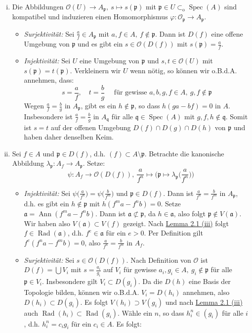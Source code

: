 \documentclass[11pt,b5paper,openany]{memoir}
\begin{document}
\begin{enumerate}[(i)]
\item Die Abbildungen $\mathcal{O}(U)\to A_\mathfrak{p},\ s\mapsto s(\mathfrak{p})$ mit $\mathfrak{p}\in U\subset_\text{o}\operatorname{Spec}(A)$ sind kompatibel und induzieren einen Homomorphismus $\varphi:\mathcal{O}_\mathfrak{p}\to A_\mathfrak{p}$.
\begin{itemize}
\item \textit{Surjektivität:} Sei $\frac{a}{f}\in A_\mathfrak{p}$ mit $a,f\in A,\ f\not\in\mathfrak{p}$. Dann ist $D(f)$ eine offene Umgebung von $\mathfrak{p}$ und es gibt ein $s\in\mathcal{O}(D(f))$ mit $s(\mathfrak{p})=\frac{a}{f}$.
\item \textit{Injektivität:} Sei $U$ eine Umgebung von $\mathfrak{p}$ und $s,t\in\mathcal{O}(U)$ mit $s(\mathfrak{p})=t(\mathfrak{p})$. Verkleinern wir $U$ wenn nötig, so können wir o.B.d.A. annehmen, dass:
\[s=\frac{a}{f},\quad t=\frac{b}{g}\quad \text{ für gewisse } a,b,g,f\in A,\ g,f\not\in\mathfrak{p} \]
Wegen $\frac{a}{f}=\frac{b}{g}$ in $A_\mathfrak{p}$, gibt es ein $h\not\in\mathfrak{p}$, so dass $h(ga-bf)=0$ in $A$. Insbesondere ist $\frac{a}{f}=\frac{b}{g}$ in $A_\mathfrak{q}$ für alle $\mathfrak{q}\in\operatorname{Spec}(A)$ mit $g,f,h\not\in\mathfrak{q}$. Somit ist $s=t$ auf der offenen Umgebung $D(f)\cap D(g)\cap D(h)$ von $\mathfrak{p}$ und haben daher denselben Keim.
\end{itemize}
\item Sei $f\in A$ und $\mathfrak{p}\in D(f)$, d.h. $(f)\subset A\setminus\mathfrak{p}$. Betrachte die kanonische Abbildung $\lambda_\mathfrak{p}:A_f\to A_\mathfrak{p}$. Setze:
\[\psi: A_f \to\mathcal{O}(D(f)),\ \frac{a}{f^n}\mapsto \Big(\mathfrak{p}\mapsto \lambda_\mathfrak{p}\Big(\frac{a}{f^n}\Big)\Big) \]
\begin{itemize}
\item \textit{Injektivität:} Sei $\psi\big(\frac{a}{f^n}\big)=\psi \big(\frac{b}{f^m}\big)$ und $\mathfrak{p}\in D(f)$. Dann ist $\frac{a}{f^n}=\frac{b}{f^m}$ in $A_\mathfrak{p}$, d.h. es gibt ein $h\not\in\mathfrak{p}$ mit $h(f^ma-f^nb)=0$. Setze $\mathfrak{a}=\operatorname{Ann}(f^ma-f^nb)$. Dann ist $\mathfrak{a}\not\subset\mathfrak{p}$, da $h\in\mathfrak{a}$, also folgt $\mathfrak{p}\not\in V(\mathfrak{a})$. Wir haben also $V(\mathfrak{a})\subset V(f)$ gezeigt. Nach \hyperref[2.1]{Lemma 2.1 (iii)} folgt $f\in\operatorname{Rad}(\mathfrak{a})$, d.h. $f^e\in\mathfrak{a}$ für ein $e>0$. Per Definition gilt $f^e(f^na-f^mb)=0$, also $\frac{a}{f^n}=\frac{b}{f^m}$ in $A_f$.
\item \textit{Surjektivität:} Sei $s\in\mathcal{O}(D(f))$. Nach Definition von $\mathcal{O}$ ist $D(f)=\bigcup V_i$ mit $s=\frac{a_i}{g_i}$ auf $V_i$ für gewisse $a_i,g_i\in A,\ g_i\not\in\mathfrak{p}$ für alle $\mathfrak{p}\in V_i$. Insbesondere gilt $V_i\subset D(g_i)$. Da die $D(h)$ eine Basis der Topologie bilden, können wir o.B.d.A. $V_i=D(h_i)$ annehmen, also $D(h_i)\subset D(g_i)$. Es folgt $V(h_i)\supset V(g_i)$ und nach \hyperref[2.1]{Lemma 2.1 (iii)} auch $\operatorname{Rad}(h_i)\subset\operatorname{Rad}(g_i)$. Wähle ein $n$, so dass $h_i^n\in (g_i)$ für alle $i$, d.h. $h_i^n=c_ig_i$ für ein $c_i\in A$. Es folgt:

\end{itemize}
\end{enumerate}
\end{document}
